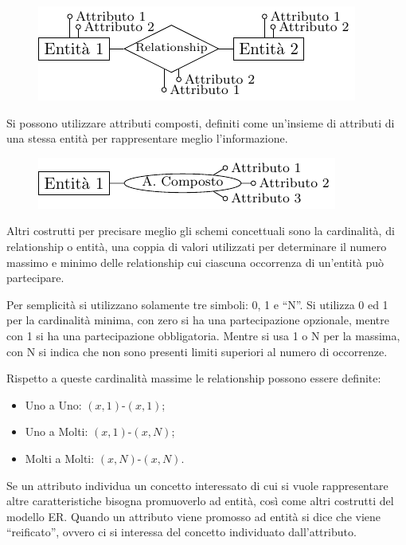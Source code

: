 \documentclass{article}
\numberwithin{equation}{subsection}
\begin{document}
\begin{figure}[H]%
    \centering%
    \includegraphics[scale=1.25]{entita_relationship_attributo.pdf}%
\end{figure}

Si possono utilizzare attributi composti, definiti come un'insieme di attributi di una stessa entità per rappresentare meglio l'informazione. 

\begin{figure}[H]%
    \centering%
    \includegraphics[scale=1.25]{entita_attributo_composto.pdf}%
\end{figure}
Altri costrutti per precisare meglio gli schemi concettuali sono la cardinalità, di relationship o entità, una coppia di valori utilizzati per determinare il numero 
massimo e minimo delle relationship cui ciascuna occorrenza di un'entità può partecipare. 

Per semplicità si utilizzano solamente tre simboli: 0, 1 e ``N''. Si utilizza 0 ed 1 per la cardinalità minima, con zero si ha una partecipazione opzionale, mentre 
con 1 si ha una partecipazione obbligatoria. Mentre si usa 1 o N per la massima, con N si indica che non sono presenti limiti superiori al numero di occorrenze. 

Rispetto a queste cardinalità massime le relationship possono essere definite:
\begin{itemize}
    \item Uno a Uno: $(x,1)$-$(x,1)$;
    \item Uno a Molti: $(x,1)$-$(x,N)$;
    \item Molti a Molti: $(x, N)$-$(x, N)$. 
\end{itemize}

Se un attributo individua un concetto interessato di cui si vuole rappresentare altre 
caratteristiche bisogna promuoverlo ad entità, così come altri costrutti del modello ER. Quando un attributo viene promosso ad entità si dice che viene ``reificato'', ovvero ci si interessa del concetto individuato dall'attributo. 
\end{document}
